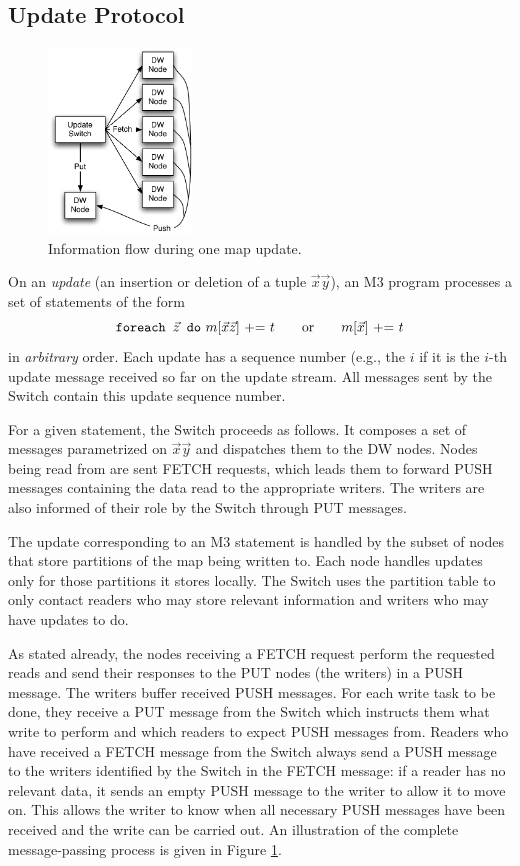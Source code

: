 \subsection{Update Protocol}


\begin{figure}
\begin{center}
\includegraphics[width=1.5in]{images/UpdateStep.pdf}
\caption{Information flow during one map update.}
\label{fig:updatestep}
\end{center}
\end{figure}


On an {\em update} (an insertion or deletion of a tuple
$\vec{x}\vec{y}$), an M3 program processes a set of statements of the form
\[
\mbox{{\tt foreach $\vec{z}$ do} $m[\vec{x}\vec{z}]$ += $t$
~~~~~or~~~~~ $m[\vec{x}]$ += $t$}
\]
in {\em arbitrary}\/ order.
%
Each update has a sequence number (e.g., the $i$ if it is the $i$-th update
message received so far on the update stream. All messages sent by the
Switch contain this update sequence number.

For a given statement, the Switch proceeds as follows.
It composes a set of messages parametrized on $\vec{x}\vec{y}$ and
dispatches them to the DW nodes.
Nodes being read from are sent FETCH requests, which leads them to forward
PUSH messages containing the data read
to the appropriate writers. The writers are also
informed of their role by the Switch through PUT messages.

The update corresponding to an M3 statement is handled by the subset of
nodes that store partitions of the map being written to.  Each node
handles updates only for those partitions it stores locally. The Switch
uses the partition table to only contact readers who may store relevant information and writers who may have updates to do. 


As stated already, the nodes receiving a FETCH request perform the
requested reads and send their responses to the PUT nodes (the writers)
in a PUSH message.
The writers buffer received PUSH messages. For each write task to be
done, they receive a PUT message from the Switch which instructs them
what write to perform and which readers to expect PUSH messages from.
Readers who have received a FETCH message from the Switch always
send a PUSH message to the writers identified by the Switch in the FETCH
message: if a reader has no relevant data, it sends an empty PUSH message to
the writer to allow it to move on.
This allows the writer to know when all necessary PUSH messages have been
received and the write can be carried out.
An illustration of the complete message-passing process is given
in Figure \ref{fig:updatestep}.  


